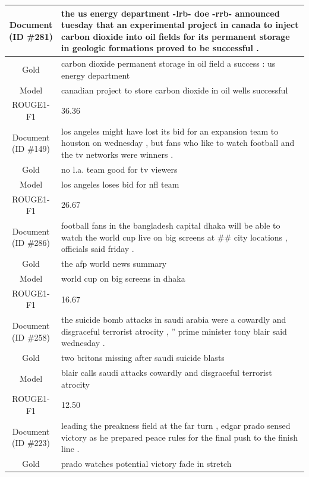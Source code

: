 \begin{table}[bth!]
\begin{tabular}{c|p{}}
\makecell{Document\\(ID \#281)} & 
the us energy department -lrb- doe -rrb- announced tuesday that an experimental project in canada to inject carbon dioxide into oil fields for its permanent storage in geologic formations proved to be successful .
\\ \hline
Gold & 
carbon dioxide permanent storage in oil field a success : us energy department
\\ \hline
Model & 
canadian project to store carbon dioxide in oil wells successful
\\ \hline
ROUGE1-F1 & 
36.36
\\ \hline
\makecell{Document\\(ID \#149)} & 
los angeles might have lost its bid for an expansion team to houston on wednesday , but fans who like to watch football and the tv networks were winners .
\\ \hline
Gold & 
no l.a. team good for tv viewers
\\ \hline
Model & 
los angeles loses bid for nfl team
\\ \hline
ROUGE1-F1 & 
26.67
\\ \hline
\makecell{Document\\(ID \#286)} & 
football fans in the bangladesh capital dhaka will be able to watch the world cup live on big screens at \#\# city locations , officials said friday .
\\ \hline
Gold & 
the afp world news summary
\\ \hline
Model & 
world cup on big screens in dhaka
\\ \hline
ROUGE1-F1 & 
16.67
\\ \hline
\makecell{Document\\(ID \#258)} & 
the suicide bomb attacks in saudi arabia were    a cowardly and disgraceful terrorist atrocity , '' prime minister tony blair said wednesday .
\\ \hline
Gold & 
two britons missing after saudi suicide blasts
\\ \hline
Model & 
blair calls saudi attacks cowardly and disgraceful terrorist atrocity
\\ \hline
ROUGE1-F1 & 
12.50
\\ \hline
\makecell{Document\\(ID \#223)} & 
leading the preakness field at the far turn , edgar prado sensed victory as he prepared peace rules for the final push to the finish line .
\\ \hline
Gold & 
prado watches potential victory fade in stretch

\end{tabular}
\end{table}
